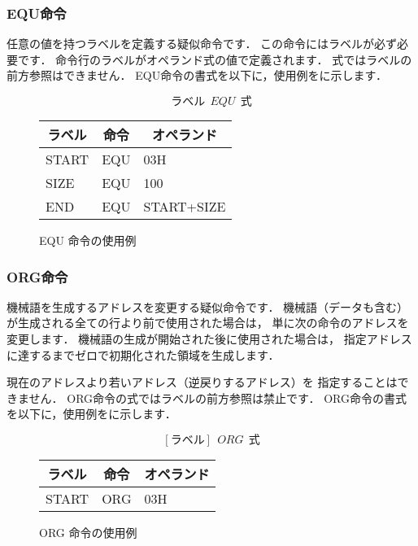 \subsubsection{EQU命令}
任意の値を持つラベルを定義する疑似命令です．
この命令にはラベルが必ず必要です．
命令行のラベルがオペランド式の値で定義されます．
式ではラベルの前方参照はできません．
EQU命令の書式を以下に，使用例をに示します．

{\small\[ ラベル~~EQU~~式 \]}

\begin{figure}[btp]
\begin{center}
{\tt\small\begin{tabular}{|l|l|l|}\hline
\multicolumn{1}{|c|}{ラベル} & 
        \multicolumn{1}{c|}{命令} & \multicolumn{1}{c|}{オペランド} \\\hline
START & EQU & 03H \\
SIZE  & EQU & 100 \\
END   & EQU & START+SIZE \\\hline
\end{tabular}}
\caption{EQU 命令の使用例}
\label{fig:appB:equ}
\end{center}
\end{figure}

\subsubsection{ORG命令}
機械語を生成するアドレスを変更する疑似命令です．
機械語（データも含む）が生成される全ての行より前で使用された場合は，
単に次の命令のアドレスを変更します．
機械語の生成が開始された後に使用された場合は，
指定アドレスに達するまでゼロで初期化された領域を生成します．

現在のアドレスより若いアドレス（逆戻りするアドレス）を
指定することはできません．
ORG命令の式ではラベルの前方参照は禁止です．
ORG命令の書式を以下に，使用例をに示します．

{\small\[ [ラベル]~~ORG~~式\]}

\begin{figure}[btp]
\begin{center}
{\tt\small\begin{tabular}{|l|l|l|}\hline
\multicolumn{1}{|c|}{ラベル} & 
        \multicolumn{1}{c|}{命令} & \multicolumn{1}{c|}{オペランド} \\\hline
START & ORG & 03H \\\hline
\end{tabular}}
\caption{ORG 命令の使用例}
\label{fig:appB:org}
\end{center}
\end{figure}

